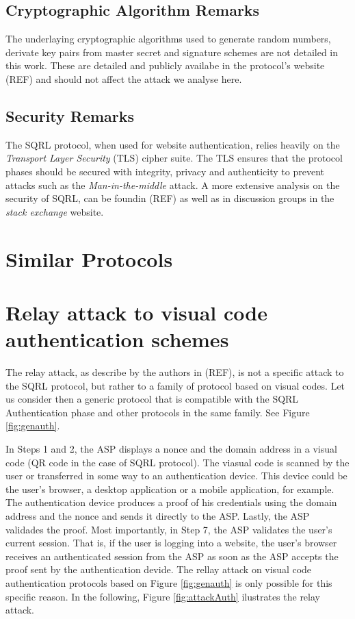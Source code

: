 \documentclass{article}
\begin{document}
	

\subsection{Cryptographic Algorithm Remarks}
	The underlaying cryptographic algorithms used to generate random numbers, derivate
	key pairs from master secret and signature schemes are not detailed in this work.
	These are detailed and publicly availabe in the protocol's website (REF) and should not
	affect the attack we analyse here. 

\subsection{Security Remarks}
	The SQRL protocol, when used for website authentication, relies heavily on
	the \emph{Transport Layer Security} (TLS) cipher suite. The TLS ensures that
	the protocol phases should be secured with integrity, privacy and authenticity
	to prevent attacks such as the \emph{Man-in-the-middle} attack. A more extensive 
	analysis on the security of SQRL, can be foundin (REF) as well as in discussion 
	groups in the \emph{stack exchange} website.

\section{Similar Protocols}

\section[Relay attack to visual code authentication schemes]{Relay attack to visual code \\
authentication schemes}
	The relay attack, as describe by the authors in (REF), is not a specific
	attack to the SQRL protocol, but rather to a family of protocol based on
	visual codes. Let us consider then a generic protocol that is compatible
	with the SQRL Authentication phase and other protocols in the same family.
	See Figure \ref{fig:genauth}.

	
	
	In Steps 1 and 2, the ASP displays a nonce and the domain address in
	a visual code (QR code in the case of SQRL protocol). The viasual code is
	scanned by the user or transferred in some way to an authentication device.
	This device could be the user's browser, a desktop application or a mobile
	application, for example. The authentication device produces a proof of
	his credentials using the domain address and the nonce and sends it directly
	to the ASP. Lastly, the ASP validades the proof. Most importantly, in Step
	7, the ASP validates the user's current session. That is, if the user is
	logging into a website, the user's browser receives an authenticated session
	from the ASP as soon as the ASP accepts the proof sent by the authentication
	devide. The rellay attack on visual code authentication protocols based on Figure
	\ref{fig:genauth} is only possible for this specific reason. In the following,
	Figure \ref{fig:attackAuth} ilustrates the relay attack.
\end{document}
